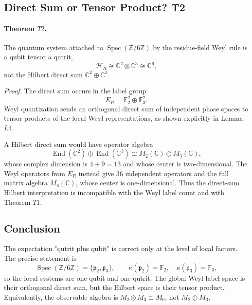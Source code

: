 \subsection{Direct Sum or Tensor Product? T2}

\paragraph{Theorem \(T2\).}
The quantum system attached to \(\operatorname{Spec}(\mathbb Z/6\mathbb Z)\)
by the residue-field Weyl rule is a qubit tensor a qutrit,
\[
  \mathcal H_R\cong\mathbb C^2\otimes\mathbb C^3\cong\mathbb C^6,
\]
not the Hilbert direct sum \(\mathbb C^2\oplus\mathbb C^3\).

\emph{Proof.}
The direct sum occurs in the label group:
\[
  E_R=\mathbb F_2^2\oplus\mathbb F_3^2.
\]
Weyl quantization sends an orthogonal direct sum of independent phase spaces
to tensor products of the local Weyl representations, as shown explicitly in
Lemma \(L4\).

A Hilbert direct sum would have operator algebra
\[
  \operatorname{End}(\mathbb C^2)\oplus\operatorname{End}(\mathbb C^3)
  \cong M_2(\mathbb C)\oplus M_3(\mathbb C),
\]
whose complex dimension is \(4+9=13\) and whose center is two-dimensional.
The Weyl operators from \(E_R\) instead give \(36\) independent operators and
the full matrix algebra \(M_6(\mathbb C)\), whose center is one-dimensional.
Thus the direct-sum Hilbert interpretation is incompatible with the Weyl label
count and with Theorem \(T1\).

\subsection{Conclusion}

The expectation "qutrit plus qubit" is correct only at the level of local
factors.  The precise statement is
\[
  \operatorname{Spec}(\mathbb Z/6\mathbb Z)
  =
  \{\mathfrak p_2,\mathfrak p_3\},
  \qquad
  \kappa(\mathfrak p_2)=\mathbb F_2,\quad
  \kappa(\mathfrak p_3)=\mathbb F_3,
\]
so the local systems are one qubit and one qutrit.  The global Weyl label
space is their orthogonal direct sum, but the Hilbert space is their tensor
product.  Equivalently, the observable algebra is \(M_2\otimes M_3\cong M_6\),
not \(M_2\oplus M_3\).
